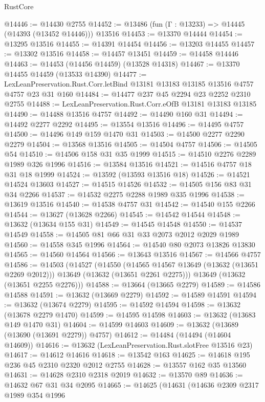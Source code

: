 \begin{lexlean}{RustCore}
\begin{coremodule}
@14446 := @14430 @2755
@14452 := @13486 (fun (Γ : @13233) => @14445 (@14393 (@13452 @14446))) @13516
@14453 := @13370 @14444
@14454 := @13295 @13516
@14455 := @14391 @14454
@14456 := @13203 @14455
@14457 := @13302 @13516
@14458 := @14457 @13451
@14459 := @14458 @14446
@14463 := @14453 (@14456 @14459) (@13528 @14318)
@14467 := @13370 @14455 @14459 (@13533 @14390)
@14477 := LexLeanPreservation.Rust.Corr.letBind @13181 @13183 @13185 @13516 @4757 @4757 @23 @31 @160
@14484 := @14477 @237 @45 @2294 @23 @2252 @2310 @2755
@14488 := LexLeanPreservation.Rust.Corr.eOfB @13181 @13183 @13185
@14490 := @14488 @13516 @4757
@14492 := @14490 @160 @31
@14494 := @14492 @2277 @2292
@14495 := @13554 @13516
@14496 := @14495 @4757
@14500 := @14496 @149 @159 @1470 @31
@14503 := @14500 @2277 @2290 @2279
@14504 := @13568 @13516
@14505 := @14504 @4757
@14506 := @14505 @54
@14510 := @14506 @158 @31 @35 @1999
@14515 := @14510 @2276 @2289 @1989 @326 @1996
@14516 := @13584 @13516
@14521 := @14516 @4757 @18 @31 @18 @1999
@14524 := @13592 (@13593 @13516 @18)
@14526 := @14521 @14524 @13603
@14527 := @14515 @14526
@14532 := @14505 @156 @83 @31 @34 @2266
@14537 := @14532 @2275 @2288 @1989 @335 @1996
@14538 := @13619 @13516
@14540 := @14538 @4757 @31
@14542 := @14540 @155 @2266
@14544 := @13627 (@13628 @2266)
@14545 := @14542 @14544
@14548 := @13632 (@13634 @155 @31)
@14549 := @14545 @14548
@14550 := @14537 @14549
@14558 := @14505 @81 @66 @31 @33 @2073 @2012 @2029 @1989
@14560 := @14558 @345 @1996
@14564 := @14540 @80 @2073 @13826 @13830
@14565 := @14560 @14564
@14566 := @13643 @13516
@14567 := @14566 @4757
@14586 := @14503
    (@14527
      (@14550
        (@14565 @14567 @13649 (@13632 (@13651 @2269 @2012)))
        @13649
        (@13632 (@13651 @2261 @2275)))
      @13649
      (@13632 (@13651 @2255 @2276)))
@14588 := @13664 (@13665 @2279)
@14589 := @14586 @14588
@14591 := @13632 (@13669 @2279)
@14592 := @14589 @14591
@14594 := @13632 (@13674 @2279)
@14595 := @14592 @14594
@14598 := @13632 (@13678 @2279 @1470)
@14599 := @14595 @14598
@14603 := @13632 (@13683 @149 @1470 @31)
@14604 := @14599 @14603
@14609 := @13632 (@13689 (@13690 (@13691 @2279)) @4757)
@14612 := @14484 (@14494 (@14604 @14609))
@14616 := @13632 (LexLeanPreservation.Rust.slotFree @13516 @23)
@14617 := @14612 @14616
@14618 := @13542 @163
@14625 := @14618 @195 @236 @45 @2310 @2320 @2012 @2755
@14628 := @13557 @162 @35 @13560
@14631 := @14628 @2310 @2318 @2019
@14632 := @13570 @89
@14636 := @14632 @67 @31 @34 @2095
@14665 := @14625
    (@14631
      (@14636
        @2309
        @2317
        @1989
        @354
        @1996

\end{coremodule}
\end{lexlean}
